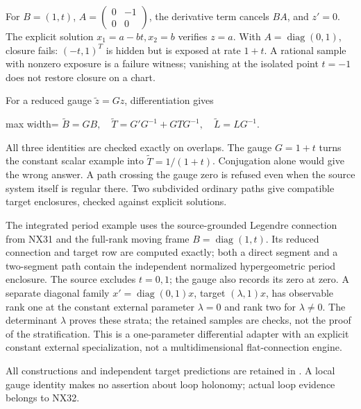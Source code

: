 \documentclass[
  11pt,
  a4paper,
]{report}
\let\singularitytexttt\texttt
\renewcommand{\texttt}[1]{\singularitytexttt{\seqsplit{#1}}}
\begin{document}
For \(B=(1,t)\),
\(A=\left(\begin{smallmatrix}0&-1\\0&0\end{smallmatrix}\right)\), the
derivative term cancels \(BA\), and \(z'=0\). The explicit solution
\(x_1=a-bt,x_2=b\) verifies \(z=a\). With
\(A=\operatorname{diag}(0,1)\), closure fails: \((-t,1)^T\) is hidden
but is exposed at rate \(1+t\). A rational sample with nonzero exposure
is a failure witness; vanishing at the isolated point \(t=-1\) does not
restore closure on a chart.

For a reduced gauge \(\widetilde z=Gz\), differentiation gives

\begin{center}
\begin{adjustbox}{max width=\linewidth}
$\displaystyle
\widetilde B=GB,\quad
\widetilde T=G'G^{-1}+GTG^{-1},\quad
\widetilde L=LG^{-1}.
$
\end{adjustbox}
\end{center}

All three identities are checked exactly on overlaps. The gauge
\(G=1+t\) turns the constant scalar example into
\(\widetilde T=1/(1+t)\). Conjugation alone would give the wrong answer.
A path crossing the gauge zero is refused even when the source system
itself is regular there. Two subdivided ordinary paths give compatible
target enclosures, checked against explicit solutions.

The integrated period example uses the source-grounded Legendre
connection from NX31 and the full-rank moving frame
\(B=\operatorname{diag}(1,t)\). Its reduced connection and target row
are computed exactly; both a direct segment and a two-segment path
contain the independent normalized hypergeometric period enclosure. The
source excludes \(t=0,1\); the gauge also records its zero at zero. A
separate diagonal family \(x'=\operatorname{diag}(0,1)x\), target
\((\lambda,1)x\), has observable rank one at the constant external
parameter \(\lambda=0\) and rank two for \(\lambda\ne0\). The
determinant \(\lambda\) proves these strata; the retained samples are
checks, not the proof of the stratification. This is a one-parameter
differential adapter with an explicit constant external specialization,
not a multidimensional flat-connection engine.

All constructions and independent target predictions are retained in
\texttt{results/nx36/nx33\_acceptance.json}. A local gauge identity
makes no assertion about loop holonomy; actual loop evidence belongs to
NX32.
\end{document}
